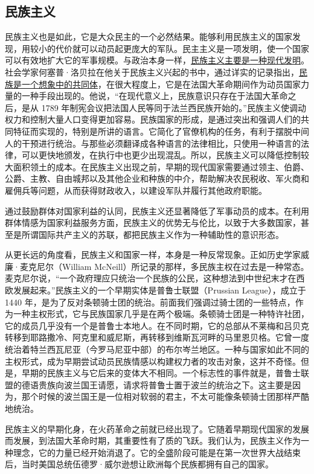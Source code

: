 \subsection{民族主义}
民族主义也是如此，它是大众民主的一个必然结果。能够利用民族主义的国家发现，用较小的代价就可以动员起更庞大的军队。民主主义是一项发明，使一个国家可以有效地扩大它的军事规模。与政治本身一样，\uline{民族主义主要是一种现代发明}。社会学家何塞普·洛贝拉在他关于民族主义兴起的书中，通过详实的记录指出，\uline{民族是一个想象中的共同体}，在很大程度上，它是在法国大革命期间作为动员国家力量的一种手段出现的。他说，“在现代意义上，民族意识只存在于法国大革命之后，是从 1789 年制宪会议把法国人民等同于法兰西民族开始的。”民族主义使调动权力和控制大量人口变得更加容易。民族国家的形成，是通过突出和强调人们的共同特征而实现的，特别是所讲的语言。它简化了官僚机构的任务，有利于摆脱中间人的干预进行统治。与那些必须翻译成各种语言的法律相比，只使用一种语言的法律，可以更快地颁发，在执行中也更少出现混乱。所以，民族主义可以降低控制较大面积领土的成本。在民族主义出现之前，早期的现代国家需要通过领主、伯爵、公爵、主教、自由城邦以及其他企业和种族的中介，帮助解决农民税收、军火商和雇佣兵等问题，从而获得财政收入，以建设军队并履行其他政府职能。

通过鼓励群体对国家利益的认同，民族主义还显著降低了军事动员的成本。在利用群体情感为国家利益服务方面，民族主义的优势无与伦比，以致于大多数国家，甚至是所谓国际共产主义的苏联，都把民族主义作为一种辅助性的意识形态。

从更长远的角度看，民族主义和国家一样，本身是一种反常现象。正如历史学家威廉·麦克尼尔（William McNeill）所记录的那样，多民族主权在过去是一种常态。麦克尼尔说，“一个政府理应只统治一个民族的公民，这种想法到中世纪末才在西欧发展起来。”民族主义的一个早期实体是普鲁士联盟（Prussian League），成立于 1440 年，是为了反对条顿骑士团的统治。前面我们强调过骑士团的一些特点，作为一种主权形式，它与民族国家几乎是在两个极端。条顿骑士团是一种特许社团，它的成员几乎没有一个是普鲁士本地人。在不同时期，它的总部从不莱梅和吕贝克转移到耶路撒冷、阿克里和威尼斯，再转移到维斯瓦河畔的马里恩贝格。它曾一度统治着特兰西瓦尼亚（今罗马尼亚中部）的布尔岑兰地区。一种与国家如此不同的主权形式，成为早期尝试动员民族情感以构建权力者的攻击对象，这并不奇怪。但是，早期的民族主义与它后来的变体大不相同。一个标志性的事件就是，普鲁士联盟的德语贵族向波兰国王请愿，请求将普鲁士置于波兰的统治之下。这主要是因为，那个时候的波兰国王是一位相对软弱的君主，不太可能像条顿骑士团那样严酷地统治。

民族主义的早期化身，在火药革命之前就已经出现了。它随着早期现代国家的发展而发展，到法国大革命时期，其重要性有了质的飞跃。我们认为，民族主义作为一种理念，它的力量已经开始消退了。它的全盛阶段可能是在第一次世界大战结束后，当时美国总统伍德罗·威尔逊想让欧洲每个民族都拥有自己的国家。

